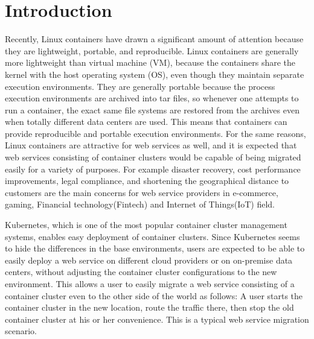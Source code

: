 \section{Introduction}

Recently, Linux containers have drawn a significant amount of attention because they are lightweight, portable, and reproducible.
Linux containers are generally more lightweight than virtual machine (VM), because the containers share the kernel with the host operating system (OS), even though they maintain separate execution environments.
They are generally portable because the process execution environments are archived into tar files,
so whenever one attempts to run a container, the exact same file systems are restored from the archives
even when totally different data centers are used.
This means that containers can provide reproducible and portable execution environments.
%
For the same reasons, Linux containers are attractive for web services as well,
and it is expected that web services consisting of container clusters would be
capable of being migrated easily for a variety of purposes. For example disaster recovery,
cost performance improvements, legal compliance, and shortening the geographical distance to customers
are the main concerns for web service providers in e-commerce, gaming, Financial technology(Fintech) and Internet of Things(IoT) field.
%

Kubernetes\cite{K8s2017}, which is one of the most popular container cluster management systems, 
enables easy deployment of container clusters.
Since Kubernetes seems to hide the differences in the base environments, users are expected to be able to easily deploy a web service on different 
cloud providers or on on-premise data centers, without adjusting the container cluster configurations to the new environment. 
This allows a user to easily migrate a web service consisting of a container cluster even to the other side of the world as follows: 
A user starts the container cluster in the new location, route the traffic there, 
then stop the old container cluster at his or her convenience.
This is a typical web service migration scenario.

